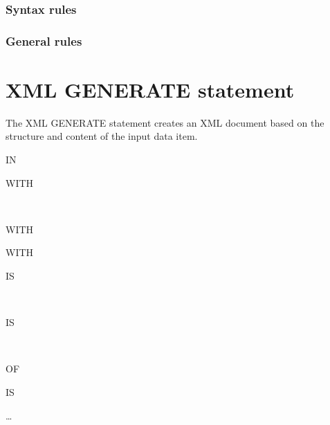\subsubsection{Syntax rules}

\subsubsection{General rules}


\section{XML GENERATE statement}

The XML GENERATE statement creates an XML document based on the structure and content of the input data item.

\begin{syntax}[\miscextcolour]
    \identifier {} \identifier

  \begin{0-1}
     IN \identifier
  \end{0-1}

  \begin{0-1}
    WITH 
    \begin{1=}
      \identifier \\
      \literal
    \end{1=}
  \end{0-1}

  \begin{0-1}
    WITH 
  \end{0-1}

  \begin{0-1}
    WITH 
  \end{0-1}

  \begin{0-1}
     IS
    \begin{1=}
      \identifier \\
      \literal
    \end{1=}
    \begin{0-1}
       IS
      \begin{1=}
        \identifier \\
        \literal
      \end{1=}
    \end{0-1}
  \end{0-1}

  \begin{0-1}
     OF
    \begin{1=}
      \identifier IS \literal
    \end{1=}\ldots
  \end{0-1}


\end{syntax}
